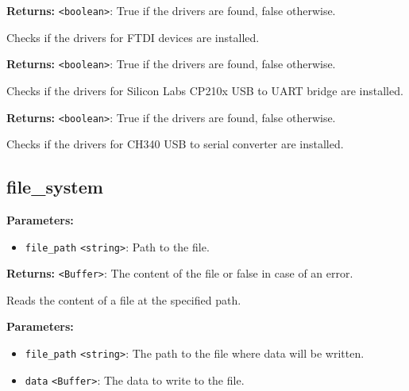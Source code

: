 \documentclass[12pt,a4paper]{article}
\begin{document}
\noindent \textbf{Returns:} \texttt{<boolean>}: True if the drivers are found, false otherwise.

\noindent Checks if the drivers for FTDI devices are installed.

\vspace{5mm}
\noindent {}


\noindent \textbf{Returns:} \texttt{<boolean>}: True if the drivers are found, false otherwise.

\noindent Checks if the drivers for Silicon Labs CP210x USB to UART bridge are installed.

\vspace{5mm}
\noindent {}


\noindent \textbf{Returns:} \texttt{<boolean>}: True if the drivers are found, false otherwise.

\noindent Checks if the drivers for CH340 USB to serial converter are installed.


\subsection{file\_system}
\vspace{5mm}
\noindent {}


\noindent \textbf{Parameters:}
\begin{itemize}
  \item \texttt{file\_path} \texttt{<string>}: Path to the file.
\end{itemize}

\noindent \textbf{Returns:} \texttt{<Buffer>}: The content of the file or false in case of an error.

\noindent Reads the content of a file at the specified path.

\vspace{5mm}
\noindent {}


\noindent \textbf{Parameters:}
\begin{itemize}
  \item \texttt{file\_path} \texttt{<string>}: The path to the file where data will be written.
  \item \texttt{data} \texttt{<Buffer>}: The data to write to the file.
\end{itemize}
\end{document}
